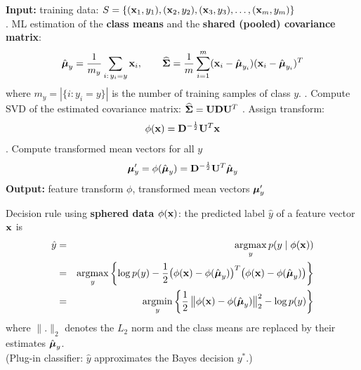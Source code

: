    \begin{algorithmic}
    \STATE \textbf{Input:} training data:  $S = \{ (\bm{\mathrm{x}}_1, y_1), (\bm{\mathrm{x}}_2, y_2), (\bm{\mathrm{x}}_3, y_3), \dots, (\bm{\mathrm{x}}_m, y_m) \}$\\
    . ML estimation of the \textbf{class means} and the \textbf{shared (pooled) covariance matrix}:
      \begin{displaymath}
        \hat{\bm{\mathrm{\mu}}}_y = \frac{1}{m_y}\sum_{i:\,y_i=y} \bm{\mathrm{x}}_i, \qquad
        \widehat{\mathbf{\Sigma}}= \frac{1}{m} \sum_{i=1}^m (\bm{\mathrm{x}}_i - \hat{\bm{\mathrm{\mu}}}_{y_i})(\bm{\mathrm{x}}_i - \hat{\bm{\mathrm{\mu}}}_{y_i})^T
      \end{displaymath}
      where $m_y = |\{i: y_i=y\}|$ is the number of training samples of class $y$.
     . Compute SVD of the estimated covariance matrix: $\widehat{\mathbf{\Sigma}}= \mathbf{U}\mathbf{D}\mathbf{U}^T$ 
     . Assign transform: 
       \begin{displaymath}
         \phi(\bm{\mathrm{x}})= \mathbf{D}^{-\frac{1}{2}} \mathbf{U}^T\bm{\mathrm{x}}
       \end{displaymath}
     . Compute transformed mean vectors for all $y$
       \begin{displaymath}
          \bm{\mathrm{\mu}}'_y = \phi(\hat{\bm{\mathrm{\mu}}}_y)= \mathbf{D}^{-\frac{1}{2}} \mathbf{U}^T \hat{\bm{\mathrm{\mu}}}_y
       \end{displaymath}
     \STATE \textbf{Output:} feature transform $\phi$, transformed mean vectors $\bm{\mathrm{\mu}}'_y$
  \end{algorithmic}
   Decision rule using \textbf{sphered data $\phi(\bm{\mathrm{x}})$}: the predicted label $\hat y$ of a feature vector $\bm{\mathrm{x}}$ is
  \begin{eqnarray*}
    \hat y &=&  \operatorname*{argmax}_y p(y\mid \phi(\bm{\mathrm{x}}))\\ 
        &=& \operatorname*{argmax}_y 
              \left\{ 
                \log p(y) - \frac{1}{2} \big( \phi(\bm{\mathrm{x}}) - \phi(\hat{\bm{\mathrm{\mu}}}_y) \big)^T \big( \phi(\bm{\mathrm{x}})-\phi(\hat{\bm{\mathrm{\mu}}}_y) \big)
              \right\} \\ 
        &=& \operatorname*{argmin}_y \left\{ \frac{1}{2}\left\|\phi(\bm{\mathrm{x}})-\phi(\hat{\bm{\mathrm{\mu}}}_y) \right\|_2^2 - \log p(y) \right\}
  \end{eqnarray*}
  where $\|.\|_2$ denotes the $L_2$ norm and the class means are replaced by their estimates $\hat{\bm{\mathrm{\mu}}}_y$.\\
  (Plug-in classifier: $\hat y$ approximates the Bayes decision $y^*$.)\\[0.3cm]
  
